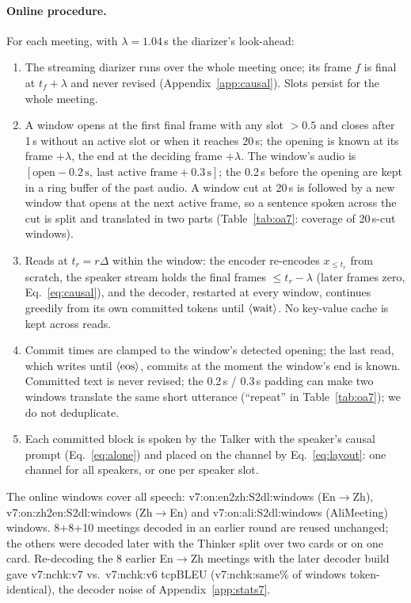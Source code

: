 \paragraph{Online procedure.} For each meeting, with $\lambda=1.04$\,s the diarizer's look-ahead:
\begin{enumerate}\setlength{\itemsep}{0pt}
\item The streaming diarizer runs over the whole meeting once; its frame $f$ is final at $t_f+\lambda$ and never revised
(Appendix~\ref{app:causal}). Slots persist for the whole meeting.
\item A window opens at the first final frame with any slot $>0.5$ and closes after 1\,s without an active slot or when it
reaches 20\,s; the opening is known at its frame $+\lambda$, the end at the deciding frame $+\lambda$. The window's audio is
$[\text{open}-0.2\,\text{s},\ \text{last active frame}+0.3\,\text{s}]$; the 0.2\,s before the opening are kept in a ring
buffer of the past audio. A window cut at 20\,s is followed by a new window that opens at the next active frame, so a
sentence spoken across the cut is split and translated in two parts (Table~\ref{tab:oa7}: coverage of 20\,s-cut windows).
\item Reads at $t_r=r\Delta$ within the window: the encoder re-encodes $x_{\le t_r}$ from scratch, the speaker stream holds
the final frames $\le t_r-\lambda$ (later frames zero, Eq.~\eqref{eq:causal}), and the decoder, restarted at every window,
continues greedily from its own committed tokens until $\langle\mathrm{wait}\rangle$. No key-value cache is kept across reads.
\item Commit times are clamped to the window's detected opening; the last read, which writes until $\langle\mathrm{eos}\rangle$, commits at the
moment the window's end is known. Committed text is never revised; the 0.2\,s / 0.3\,s padding can make two windows
translate the same short utterance (``repeat'' in Table~\ref{tab:oa7}); we do not deduplicate.
\item Each committed block is spoken by the Talker with the speaker's causal prompt (Eq.~\eqref{eq:alone}) and placed on
the channel by Eq.~\eqref{eq:layout}: one channel for all speakers, or one per speaker slot.
\end{enumerate}
The online windows cover all speech: \num{v7:on:en2zh:S2dl:windows} (En$\rightarrow$Zh), \num{v7:on:zh2en:S2dl:windows}
(Zh$\rightarrow$En) and \num{v7:on:ali:S2dl:windows} (AliMeeting) windows. 8+8+10 meetings decoded in an earlier round are
reused unchanged; the others were decoded later with the Thinker split over two cards or on one card. Re-decoding the 8
earlier En$\rightarrow$Zh meetings with the later decoder build gave \num{v7:nchk:v7} vs.\ \num{v7:nchk:v6}
tcpBLEU (\num{v7:nchk:same}\% of windows token-identical), the decoder noise of Appendix~\ref{app:stats7}.

